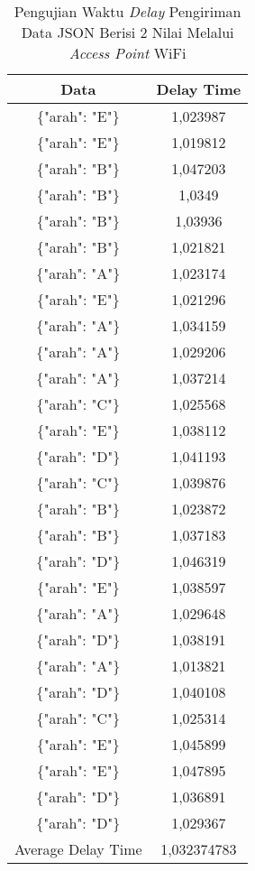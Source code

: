 \begin{table}[!ht]
  \centering
  \caption{Pengujian Waktu \emph{Delay} Pengiriman Data JSON Berisi 2 Nilai Melalui \emph{Access Point} WiFi}
  \label{tbl:delayWiFiJSON1}
  \begin{tabular}{|c|c|}
  \hline
  Data               & Delay Time  \\ \hline
  \{"arah": "E"\}    & 1,023987    \\ \hline
  \{"arah": "E"\}    & 1,019812    \\ \hline
  \{"arah": "B"\}    & 1,047203    \\ \hline
  \{"arah": "B"\}    & 1,0349      \\ \hline
  \{"arah": "B"\}    & 1,03936     \\ \hline
  \{"arah": "B"\}    & 1,021821    \\ \hline
  \{"arah": "A"\}    & 1,023174    \\ \hline
  \{"arah": "E"\}    & 1,021296    \\ \hline
  \{"arah": "A"\}    & 1,034159    \\ \hline
  \{"arah": "A"\}    & 1,029206    \\ \hline
  \{"arah": "A"\}    & 1,037214    \\ \hline
  \{"arah": "C"\}    & 1,025568    \\ \hline
  \{"arah": "E"\}    & 1,038112    \\ \hline
  \{"arah": "D"\}    & 1,041193    \\ \hline
  \{"arah": "C"\}    & 1,039876    \\ \hline
  \{"arah": "B"\}    & 1,023872    \\ \hline
  \{"arah": "B"\}    & 1,037183    \\ \hline
  \{"arah": "D"\}    & 1,046319    \\ \hline
  \{"arah": "E"\}    & 1,038597    \\ \hline
  \{"arah": "A"\}    & 1,029648    \\ \hline
  \{"arah": "D"\}    & 1,038191    \\ \hline
  \{"arah": "A"\}    & 1,013821    \\ \hline
  \{"arah": "D"\}    & 1,040108    \\ \hline
  \{"arah": "C"\}    & 1,025314    \\ \hline
  \{"arah": "E"\}    & 1,045899    \\ \hline
  \{"arah": "E"\}    & 1,047895    \\ \hline
  \{"arah": "D"\}    & 1,036891    \\ \hline
  \{"arah": "D"\}    & 1,029367    \\ \hline
  Average Delay Time & 1,032374783 \\ \hline
  \end{tabular}
\end{table}

